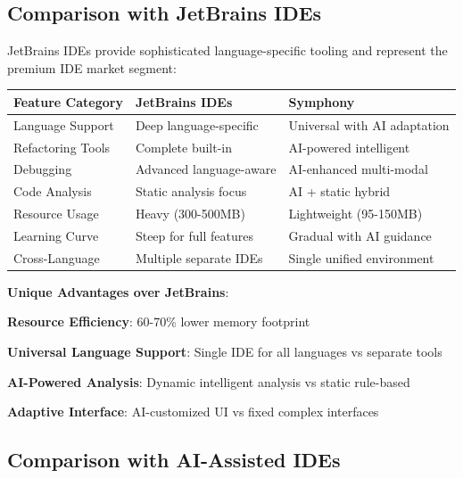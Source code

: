 \subsection*{Comparison with JetBrains IDEs}

JetBrains IDEs provide sophisticated language-specific tooling and represent the premium IDE market segment:

\begin{center}
\begin{tabular}{@{}lll@{}}
\toprule
\textbf{Feature Category} & \textbf{JetBrains IDEs} & \textbf{Symphony} \\
\midrule
Language Support & Deep language-specific & Universal with AI adaptation \\
Refactoring Tools & Complete built-in & AI-powered intelligent \\
Debugging & Advanced language-aware & AI-enhanced multi-modal \\
Code Analysis & Static analysis focus & AI + static hybrid \\
Resource Usage & Heavy (300-500MB) & Lightweight (95-150MB) \\
Learning Curve & Steep for full features & Gradual with AI guidance \\
Cross-Language & Multiple separate IDEs & Single unified environment \\
\bottomrule
\end{tabular}
\end{center}

\textbf{Unique Advantages over JetBrains}:
\begin{compactlist}
    \item \textbf{Resource Efficiency}: 60-70\% lower memory footprint
    \item \textbf{Universal Language Support}: Single IDE for all languages vs separate tools
    \item \textbf{AI-Powered Analysis}: Dynamic intelligent analysis vs static rule-based
    \item \textbf{Adaptive Interface}: AI-customized UI vs fixed complex interfaces
\end{compactlist}

\subsection*{Comparison with AI-Assisted IDEs}

